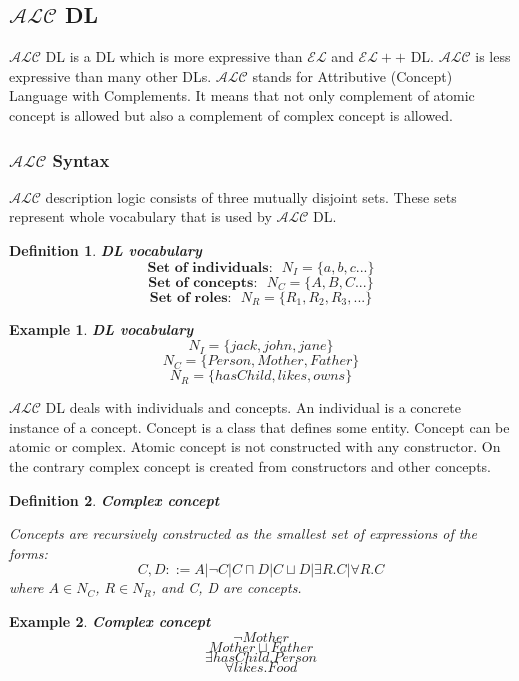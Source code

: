 \documentclass[12pt,a4paper]{article}
\newtheorem{definition}{Definition}[subsection]
\newtheorem{example}{Example}[subsection]
\begin{document}
\subsection{$\mathcal{ALC}$ DL}
$\mathcal{ALC}$ DL is a DL which is more expressive than $\mathcal{EL}$ and $\mathcal{EL}{+}{+}$ DL. $\mathcal{ALC}$ is less expressive than many other DLs. $\mathcal{ALC}$ stands for Attributive (Concept) Language with Complements. It means that not only complement of atomic concept is allowed but also a complement of complex concept is allowed.

\subsubsection{$\mathcal{ALC}$ Syntax}
$\mathcal{ALC}$ description logic consists of three mutually disjoint sets. These sets represent whole vocabulary that is used by $\mathcal{ALC}$ DL.

\begin{definition}{\textbf{DL vocabulary}}
	\[ \textbf{Set of individuals:} \text{ } N_{I} = \{a,b,c...\} \]
	\[ \textbf{Set of concepts:} \text{ } N_{C} = \{A,B,C...\} \]
	\[ \textbf{Set of roles:} \text{ } N_{R} = \{R_{1},R_{2},R_{3},...\} \]
\end{definition}

\begin{example}{\textbf{DL vocabulary}}
	\[ N_{I} = \{ jack, john, jane \} \]
	\[ N_{C} = \{ Person, Mother, Father \} \]
	\[ N_{R} = \{ hasChild, likes, owns \} \]
\end{example}

$\mathcal{ALC}$ DL deals with individuals and concepts. An individual is a concrete instance of a concept. Concept is a class that defines some entity. Concept can be atomic or complex. Atomic concept is not constructed with any constructor. On the contrary complex concept is created from constructors and other concepts.

\begin{definition}{\textbf{Complex concept}}
	
	Concepts are recursively constructed as the smallest set of expressions of the forms:
	\[ C,D ::= A | \neg C | C \sqcap D | C \sqcup D | \exists R.C | \forall R.C \]
	where $A \in N_{C}$, $R \in N_{R}$, and C, D are concepts.
\end{definition}

\begin{example}{\textbf{Complex concept}}
\[ \neg Mother \]
\[ Mother \sqcup Father \]
\[ \exists hasChild.Person \]
\[ \forall likes.Food \]
\end{example}
\end{document}
